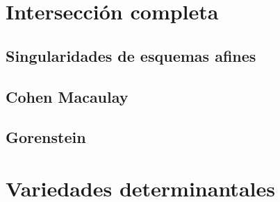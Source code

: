 \documentclass[12pt]{book}
\begin{document}
\chapter{Intersección completa}	




\section{Singularidades de esquemas afines}

\section{Cohen Macaulay}

\section{Gorenstein}


\chapter{Variedades determinantales}
	
\end{document}
